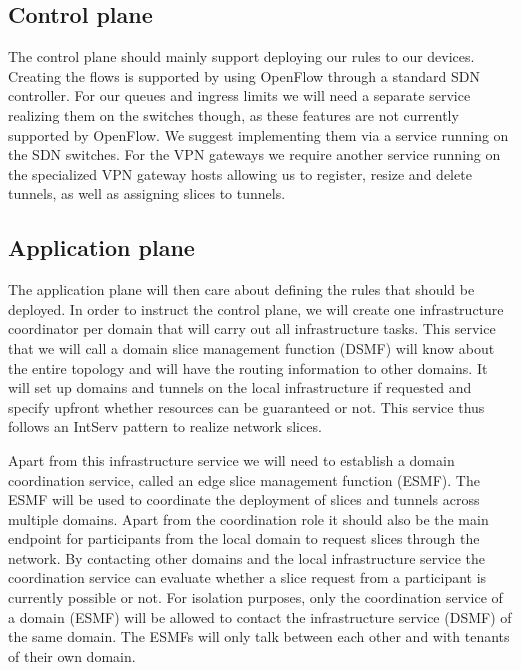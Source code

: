 \subsection{Control plane}
The control plane should mainly support deploying our rules to our devices. Creating the flows is supported by using OpenFlow through a standard SDN controller. For our queues and ingress limits we will need a separate service realizing them on the switches though, as these features are not currently supported by OpenFlow. We suggest implementing them via a service running on the SDN switches. For the VPN gateways we require another service running on the specialized VPN gateway hosts allowing us to register, resize and delete tunnels, as well as assigning slices to tunnels.

\subsection{Application plane}
The application plane will then care about defining the rules that should be deployed. In order to instruct the control plane, we will create one infrastructure coordinator per domain that will carry out all infrastructure tasks. This service that we will call a domain slice management function (DSMF) will know about the entire topology and will have the routing information to other domains. It will set up domains and tunnels on the local infrastructure if requested and specify upfront whether resources can be guaranteed or not. This service thus follows an IntServ pattern to realize network slices.

Apart from this infrastructure service we will need to establish a domain coordination service, called an edge slice management function (ESMF). The ESMF will be used to coordinate the deployment of slices and tunnels across multiple domains. Apart from the coordination role it should also be the main endpoint for participants from the local domain to request slices through the network. By contacting other domains and the local infrastructure service the coordination service can evaluate whether a slice request from a participant is currently possible or not. For isolation purposes, only the coordination service of a domain (ESMF) will be allowed to contact the infrastructure service (DSMF) of the same domain. The ESMFs will only talk between each other and with tenants of their own domain.

